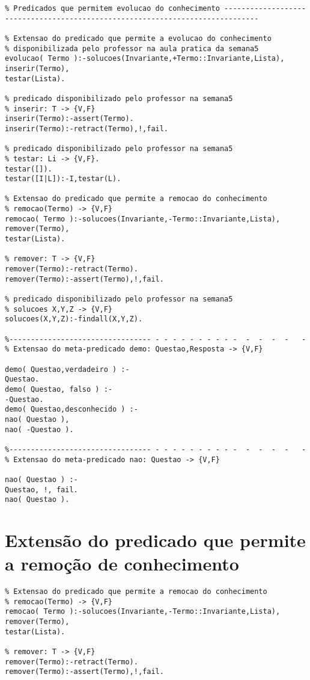\documentclass[
  oneside,
  10pt, a4paper,
  footinclude=true,
  headinclude=true,
  cleardoublepage=empty
]{scrbook}
\begin{document}
\begin{lstlisting}	
% Predicados que permitem evolucao do conhecimento ------------------------------------------------------------------------------

% Extensao do predicado que permite a evolucao do conhecimento
% disponibilizada pelo professor na aula pratica da semana5
evolucao( Termo ):-solucoes(Invariante,+Termo::Invariante,Lista),
inserir(Termo),
testar(Lista).

% predicado disponibilizado pelo professor na semana5
% inserir: T -> {V,F}
inserir(Termo):-assert(Termo).
inserir(Termo):-retract(Termo),!,fail.

% predicado disponibilizado pelo professor na semana5
% testar: Li -> {V,F}.
testar([]).
testar([I|L]):-I,testar(L).

% Extensao do predicado que permite a remocao do conhecimento
% remocao(Termo) -> {V,F}
remocao( Termo ):-solucoes(Invariante,-Termo::Invariante,Lista),
remover(Termo),
testar(Lista).

% remover: T -> {V,F}
remover(Termo):-retract(Termo).
remover(Termo):-assert(Termo),!,fail.

% predicado disponibilizado pelo professor na semana5
% solucoes X,Y,Z -> {V,F}
solucoes(X,Y,Z):-findall(X,Y,Z).

%--------------------------------- - - - - - - - - - -  -  -  -  -   -
% Extensao do meta-predicado demo: Questao,Resposta -> {V,F}

demo( Questao,verdadeiro ) :-
Questao.
demo( Questao, falso ) :-
-Questao.
demo( Questao,desconhecido ) :-
nao( Questao ),
nao( -Questao ).

%--------------------------------- - - - - - - - - - -  -  -  -  -   -
% Extensao do meta-predicado nao: Questao -> {V,F}

nao( Questao ) :-
Questao, !, fail.
nao( Questao ).
\end{lstlisting}

	
	\section{Extensão do predicado que permite a remoção de conhecimento}
	\label{remocao_anexo}
\begin{lstlisting}	
% Extensao do predicado que permite a remocao do conhecimento
% remocao(Termo) -> {V,F}
remocao( Termo ):-solucoes(Invariante,-Termo::Invariante,Lista),
remover(Termo),
testar(Lista).

% remover: T -> {V,F}
remover(Termo):-retract(Termo).
remover(Termo):-assert(Termo),!,fail.
\end{lstlisting}
\end{document}

